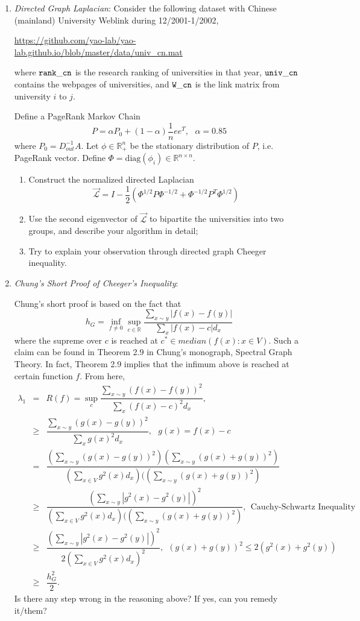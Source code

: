 \documentclass[11pt]{article}
\def\R{{\mathbb R}}
\def\diag{{\mathrm{diag}}}
\begin{document}
\begin{enumerate}
\item {\em *Directed Graph Laplacian}: Consider the following dataset with Chinese (mainland) University Weblink during 12/2001-1/2002,

\url{https://github.com/yao-lab/yao-lab.github.io/blob/master/data/univ_cn.mat}

where $\tt{rank\_{}cn}$ is the research ranking of universities in that year, $\tt{univ\_{}cn}$ contains the webpages of universities, and $\tt{W\_{}cn}$ is the link matrix from university
$i$ to $j$. 

Define a PageRank Markov Chain
\[  P = \alpha P_0 + (1-\alpha) \frac{1}{n} e e^T, \ \ \ \alpha = 0.85 \]
where $P_0 = D_{out}^{-1} A$. Let $\phi\in \R_+^n$ be the stationary distribution of $P$, i.e. PageRank vector. Define $\Phi = \diag(\phi_i)\in \R^{n\times n}$.
\begin{enumerate}
\item Construct the normalized directed Laplacian 
\[ \mathcal{\vec{L}}=I - \frac{1}{2}(\Phi^{1/2} P \Phi^{-1/2} + \Phi^{-1/2} P^T \Phi^{1/2} ) \]
\item Use the second eigenvector of $\mathcal{\vec{L}}$ to bipartite the universities into two groups, and describe your algorithm in detail;
\item Try to explain your observation through directed graph Cheeger inequality.
\end{enumerate} 
  


\item {\em *Chung's Short Proof of Cheeger's Inequality}: 

Chung's short proof is based on the fact that 
\begin{equation} 
h_G = \inf_{f\neq 0} \sup_{c\in \R} \frac{\sum_{x\sim y} |f(x) - f(y)|}{\sum_x |f(x) -c|d_x} 
\end{equation}
where the supreme over $c$ is reached at $c^*\in median(f(x):x\in V)$. Such a claim can be found in Theorem 2.9 in Chung's monograph, Spectral Graph Theory. In fact, Theorem 2.9 implies that the infimum above is reached at certain function $f$. From here, 
\begin{eqnarray}
\lambda_1 & =& R(f)=\sup_c \dfrac{\sum_{x\sim y}(f(x) - f(y))^2}{\sum_{x}(f(x)-c)^2 d_x},  \\
& \geq  &\dfrac{\sum_{x\sim y}(g(x) - g(y))^2}{\sum_{x}g(x)^2 d_x}, \ \ \ g(x)=f(x)-c\\
& = & \dfrac{(\sum_{x\sim y}(g(x) - g(y))^2)(\sum_{x\sim y}(g(x) +g(y))^2)}{(\sum_{x\in V}g^2(x)d_x)((\sum_{x\sim y}(g(x) +g(y))^2)} \\
& \ge & \dfrac{(\sum_{x\sim y}|g^2(x) - g^2(y)|)^2}{(\sum_{x\in V}g^2(x)d_x)((\sum_{x\sim y}(g(x) +g(y))^2)} , \ \ \textrm{Cauchy-Schwartz Inequality} \\
& \ge & \dfrac{(\sum_{x\sim y}|g^2(x) - g^2(y)|)^2}{2( \sum_{x\in V}g^2(x)d_x)^2} , \ \ \textrm{$(g(x)+g(y))^2\leq 2 (g^2(x)+g^2(y))$} \\
& \ge & \dfrac{h_G^2}{2}.
\end{eqnarray}
Is there any step wrong in the reasoning above? If yes, can you remedy it/them?

\end{enumerate}
\end{document}
